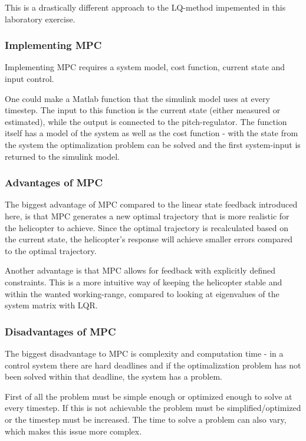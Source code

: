 \documentclass[../main.tex]{subfiles}
\begin{document}
This is a drastically different approach to the LQ-method impemented in this laboratory exercise.

\subsubsection{Implementing MPC}
Implementing MPC requires a system model, cost function, current state and input control.

One could make a Matlab function that the simulink model uses at every timestep. The input to this function is the current state (either measured or estimated), while the output is connected to the pitch-regulator. The function itself has a model of the system as well as the cost function - with the state from the system the optimalization problem can be solved and the first system-input is returned to the simulink model. 

\subsubsection{Advantages of MPC}
The biggest advantage of MPC compared to the linear state feedback introduced here, is that MPC generates a new optimal trajectory that is more realistic for the helicopter to achieve. Since the optimal trajectory is recalculated based on the current state, the helicopter's response will achieve smaller errors compared to the optimal trajectory. 


Another advantage is that MPC allows for feedback with explicitly defined constraints. This is a more intuitive way of keeping the helicopter stable and within the wanted working-range, compared to looking at eigenvalues of the system matrix with LQR.

\subsubsection{Disadvantages of MPC}
The biggest disadvantage to MPC is complexity and computation time - in a control system there are hard deadlines and if the optimalization problem has not been solved within that deadline, the system has a problem.

First of all the problem must be simple enough or optimized enough to solve at every timestep. If this is not achievable the problem must be simplified/optimized or the timestep must be increased. The time to solve a problem can also vary, which makes this issue more complex.
\end{document}
